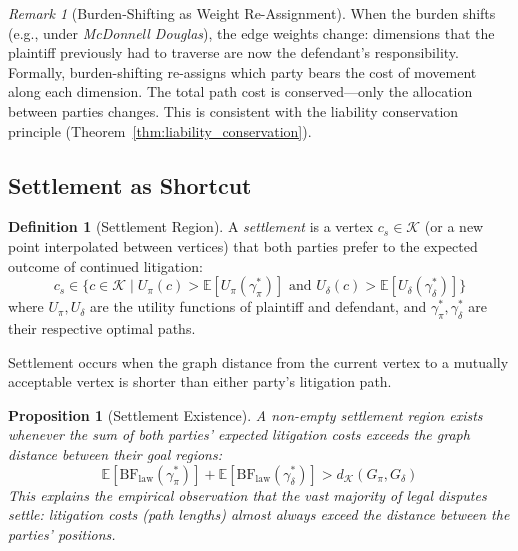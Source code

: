 \documentclass[12pt]{article}
\newtheorem{proposition}[theorem]{Proposition}
\theoremstyle{definition}
\newtheorem{definition}[theorem]{Definition}
\theoremstyle{remark}
\newtheorem{remark}[theorem]{Remark}
\newcommand{\BF}{\mathrm{BF}}
\begin{document}
\begin{remark}[Burden-Shifting as Weight Re-Assignment]
When the burden shifts (e.g., under \emph{McDonnell Douglas}), the edge weights change: dimensions that the plaintiff previously had to traverse are now the defendant's responsibility.  Formally, burden-shifting re-assigns which party bears the cost of movement along each dimension.  The total path cost is conserved---only the allocation between parties changes.  This is consistent with the liability conservation principle (Theorem~\ref{thm:liability_conservation}).
\end{remark}

\subsection{Settlement as Shortcut}

\begin{definition}[Settlement Region]
A \emph{settlement} is a vertex $c_s \in \mathcal{K}$ (or a new point interpolated between vertices) that both parties prefer to the expected outcome of continued litigation:
\begin{equation}
c_s \in \{ c \in \mathcal{K} \mid U_\pi(c) > \mathbb{E}[U_\pi(\gamma^*_\pi)] \text{ and } U_\delta(c) > \mathbb{E}[U_\delta(\gamma^*_\delta)] \}
\label{eq:settlement}
\end{equation}
where $U_\pi, U_\delta$ are the utility functions of plaintiff and defendant, and $\gamma^*_\pi, \gamma^*_\delta$ are their respective optimal paths.
\end{definition}

Settlement occurs when the graph distance from the current vertex to a mutually acceptable vertex is shorter than either party's litigation path.

\begin{proposition}[Settlement Existence]
\label{prop:settlement}
A non-empty settlement region exists whenever the sum of both parties' expected litigation costs exceeds the graph distance between their goal regions:
\begin{equation}
\mathbb{E}[\BF_{\text{law}}(\gamma^*_\pi)] + \mathbb{E}[\BF_{\text{law}}(\gamma^*_\delta)] > d_{\mathcal{K}}(G_\pi, G_\delta)
\label{eq:settlement_exists}
\end{equation}
This explains the empirical observation that the vast majority of legal disputes settle: litigation costs (path lengths) almost always exceed the distance between the parties' positions.
\end{proposition}
\end{document}
